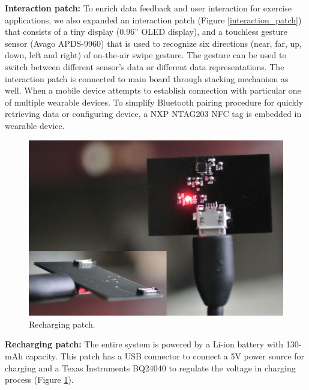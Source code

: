 \textbf{Interaction patch:}
\newline
To enrich data feedback and user interaction for exercise applications, we also expanded an interaction patch (Figure \ref{interaction_patch}) that consists of a tiny display (0.96” OLED display), and a touchless gesture sensor (Avago APDS-9960) that is used to recognize six directions (near, far, up, down, left and right) of on-the-air swipe gesture. The gesture can be used to switch between different sensor's data or different data representations. The interaction patch is connected to main board through stacking mechanism as well. When a mobile device attempts to establish connection with particular one of multiple wearable devices. To simplify Bluetooth pairing procedure for quickly retrieving data or configuring device, a NXP NTAG203 NFC tag is embedded in wearable device.
\vspace{10pt}
\begin{figure}[ht]
\centering
\includegraphics[width=13cm]{image/bio_recharge}
\caption{Recharging patch.}
\label{bio_recharge}
\end{figure}
\newline
\textbf{Recharging patch:}
\newline
The entire system is powered by a Li-ion battery with 130-mAh capacity. This patch has a USB connector to connect a 5V power source for charging and a Texas Instruments BQ24040 to regulate the voltage in charging process (Figure \ref{bio_recharge}).

